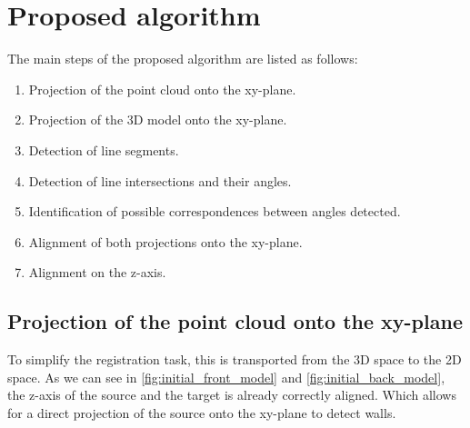     \section{Proposed algorithm}
        The main steps of the proposed algorithm are listed as follows:
        \begin{enumerate}
            \itemsep 0em 
            \item Projection of the point cloud onto the xy-plane.
            \item Projection of the 3D model onto the xy-plane.
            \item Detection of line segments.
            \item Detection of line intersections and their angles.
            \item Identification of possible correspondences between angles detected.
            \item Alignment of both projections onto the xy-plane.
            \item Alignment on the z-axis.
        \end{enumerate}

        \subsection{Projection of the point cloud onto the xy-plane}
        \label{sub:Projection of the point cloud onto the xy-plane}
            To simplify the registration task, this is transported from the 3D space to the 2D space.
            As we can see in \autoref{fig:initial_front_model} and \autoref{fig:initial_back_model}, 
            the z-axis of the source and the target is already correctly aligned.
            Which allows for a direct projection of the source onto the xy-plane to detect walls.


